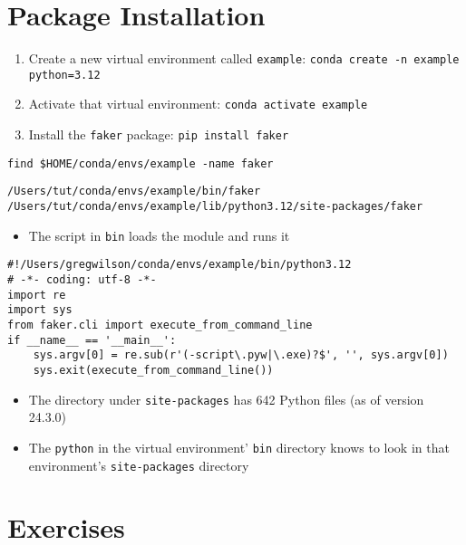 \documentclass[krantzl]{krantz}
\begin{document}
\section{Package Installation}
\begin{enumerate}
\item Create a new virtual environment called \texttt{example}: \texttt{conda create -n example python=3.12}

\item Activate that virtual environment: \texttt{conda activate example}

\item Install the \texttt{faker} package: \texttt{pip install faker}

\end{enumerate}
\begin{lstlisting}[frame=tblr]
find $HOME/conda/envs/example -name faker
\end{lstlisting}

\begin{lstlisting}[frame=tblr,backgroundcolor=\color{black!5}]
/Users/tut/conda/envs/example/bin/faker
/Users/tut/conda/envs/example/lib/python3.12/site-packages/faker
\end{lstlisting}

\begin{itemize}
\item The script in \texttt{bin} loads the module and runs it

\end{itemize}
\begin{lstlisting}[frame=tblr]
#!/Users/gregwilson/conda/envs/example/bin/python3.12
# -*- coding: utf-8 -*-
import re
import sys
from faker.cli import execute_from_command_line
if __name__ == '__main__':
    sys.argv[0] = re.sub(r'(-script\.pyw|\.exe)?$', '', sys.argv[0])
    sys.exit(execute_from_command_line())
\end{lstlisting}

\begin{itemize}
\item The directory under \texttt{site-packages} has 642 Python files (as of version 24.3.0)

\item The \texttt{python} in the virtual environment’ \texttt{bin} directory
    knows to look in that environment’s \texttt{site-packages} directory

\end{itemize}
\section{Exercises}
\end{document}
